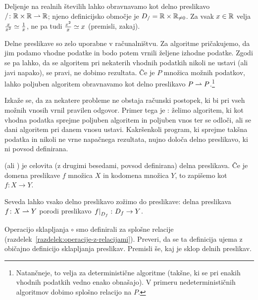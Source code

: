                 \begin{zgled}
                        Deljenje na realnih številih lahko obravnavamo kot delno preslikavo $/\colon \mathbb{R} \times \mathbb{R} \mathrel{\rightharpoonup} \mathbb{R}$; njeno definicijsko območje je $D_{/} = \mathbb{R} \times \mathbb{R}_{\neq 0}$. Za vsak $x \in \mathbb{R}$ velja $\frac{x}{x^2} \simeq \frac{1}{x}$, ne pa tudi $\frac{x^2}{x} \simeq x$ (premisli, zakaj).
                \end{zgled}

                \begin{zgled}
                        Delne preslikave so zelo uporabne v računalništvu. Za algoritme pričakujemo, da jim podamo vhodne podatke in bodo potem vrnili željene izhodne podatke. Zgodi se pa lahko, da se algoritem pri nekaterih vhodnih podatkih nikoli ne ustavi (ali javi napako), se pravi, ne dobimo rezultata. Če je $P$ množica možnih podatkov, lahko poljuben algoritem obravnavamo kot delno preslikavo $P \mathrel{\rightharpoonup} P$.\footnote{Natančneje, to velja za deterministične algoritme (takšne, ki se pri enakih vhodnih podatkih vedno enako obnašajo). V primeru nedeterminističnih algoritmov dobimo splošno relacijo na $P$.}

                        Izkaže se, da za nekatere probleme ne obstaja računski postopek, ki bi pri vseh možnih vnosih vrnil pravilen odgovor. Primer tega je : želimo algoritem, ki kot vhodna podatka sprejme poljuben algoritem in poljuben vnos ter se odloči, ali se dani algoritem pri danem vnosu ustavi. Kakršenkoli program, ki sprejme takšna podatka in nikoli ne vrne napačnega rezultata, nujno določa delno preslikavo, ki ni povsod definirana. 
                \end{zgled}

                \begin{definicija}
                         (ali ) je celovita (z drugimi besedami, povsod definirana) delna preslikava. Če je domena preslikave $f$ množica $X$ in kodomena množica $Y$, to zapišemo kot $f\colon X \to Y$.
                \end{definicija}

                Seveda lahko vsako delno preslikavo zožimo do preslikave: delna preslikava $f\colon X \mathrel{\rightharpoonup} Y$ porodi preslikavo $\left.{f}\right|_{D_{f}}\colon D_{f} \to Y$.

                \begin{vaja}
                        Operacijo sklapljanja $\circ$ smo definirali za splošne relacije (razdelek~\ref{razdelek:operacije-z-relacijami}). Preveri, da se ta definicija ujema z običajno definicijo sklapljanja preslikav. Premisli še, kaj je sklop delnih preslikav.
                \end{vaja}


